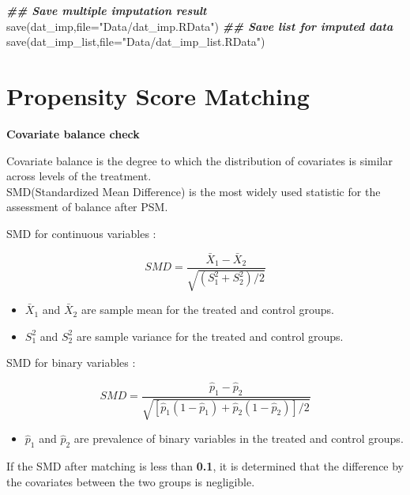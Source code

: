 \documentclass[
]{book}
\newenvironment{Shaded}{\begin{snugshade}}{\end{snugshade}}
\newcommand{\AttributeTok}[1]{\textcolor[rgb]{0.77,0.63,0.00}{#1}}
\newcommand{\DocumentationTok}[1]{\textcolor[rgb]{0.56,0.35,0.01}{\textbf{\textit{#1}}}}
\newcommand{\FunctionTok}[1]{\textcolor[rgb]{0.00,0.00,0.00}{#1}}
\newcommand{\NormalTok}[1]{#1}
\newcommand{\StringTok}[1]{\textcolor[rgb]{0.31,0.60,0.02}{#1}}
\providecommand{\tightlist}{%
  \setlength{\itemsep}{0pt}\setlength{\parskip}{0pt}}
\theoremstyle{definition}
\theoremstyle{definition}
\theoremstyle{definition}
\theoremstyle{definition}
\theoremstyle{remark}
\begin{document}
\begin{Shaded}
\begin{Highlighting}[]
\DocumentationTok{\#\# Save multiple imputation result}
\FunctionTok{save}\NormalTok{(dat\_imp,}\AttributeTok{file=}\StringTok{"Data/dat\_imp.RData"}\NormalTok{)}
\DocumentationTok{\#\# Save list for imputed data}
\FunctionTok{save}\NormalTok{(dat\_imp\_list,}\AttributeTok{file=}\StringTok{"Data/dat\_imp\_list.RData"}\NormalTok{)}
\end{Highlighting}
\end{Shaded}

\hypertarget{propensity-score-matching}{%
\chapter{Propensity Score Matching}\label{propensity-score-matching}}

\textbf{Covariate balance check}

Covariate balance is the degree to which the distribution of covariates is similar across levels of the treatment.\\
SMD(Standardized Mean Difference) is the most widely used statistic for the assessment of balance after PSM.

SMD for continuous variables :

\[SMD=\frac{\bar X_1-\bar X_2}{\sqrt{(S^2_1+S^2_2)/2}}\]

\begin{itemize}
\tightlist
\item
  \(\bar X_1\) and \(\bar X_2\) are sample mean for the treated and control groups.\\
\item
  \(S^2_1\) and \(S^2_2\) are sample variance for the treated and control groups.
\end{itemize}

SMD for binary variables :

\[SMD=\frac{\hat p_1-\hat p_2}{\sqrt{[\hat p_1(1-\hat p_1)+\hat p_2(1-\hat p_2)]/2}}\]

\begin{itemize}
\tightlist
\item
  \(\hat p_1\) and \(\hat p_2\) are prevalence of binary variables in the treated and control groups.
\end{itemize}

If the SMD after matching is less than \textbf{0.1}, it is determined that the difference by the covariates between the two groups is negligible.
\end{document}
